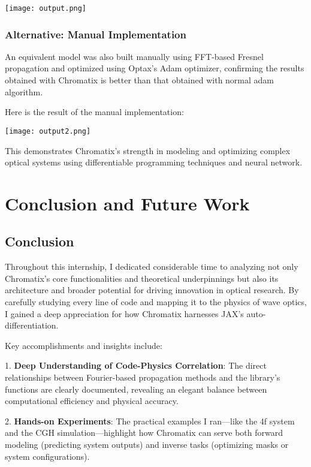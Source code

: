 \documentclass[a4paper,12pt]{report}
\begin{document}
\begin{center}
  \texttt{[image: output.png]}
\end{center}

\subsection{Alternative: Manual Implementation}

An equivalent model was also built manually using FFT-based Fresnel propagation and optimized using Optax's Adam optimizer, confirming the results obtained with Chromatix is better than that obtained with normal adam algorithm.

Here is the result of the manual implementation:

\begin{center}
  \texttt{[image: output2.png]}
\end{center}

This demonstrates Chromatix's strength in modeling and optimizing complex optical systems using differentiable programming techniques and neural network.


\chapter{Conclusion and Future Work}
\section{Conclusion}
Throughout this internship, I dedicated considerable time to analyzing not only Chromatix's core functionalities and theoretical underpinnings but also its architecture and broader potential for driving innovation in optical research. By carefully studying every line of code and mapping it to the physics of wave optics, I gained a deep appreciation for how Chromatix harnesses JAX's auto-differentiation.

\vspace{0.5em}
Key accomplishments and insights include:

\vspace{0.5em}
1. \textbf{Deep Understanding of Code-Physics Correlation}: The direct relationships between Fourier-based propagation methods and the library’s functions are clearly documented, revealing an elegant balance between computational efficiency and physical accuracy.

\vspace{0.5em}
2. \textbf{Hands-on Experiments}: The practical examples I ran—like the 4f system and the CGH simulation—highlight how Chromatix can serve both forward modeling (predicting system outputs) and inverse tasks (optimizing masks or system configurations).
\end{document}
